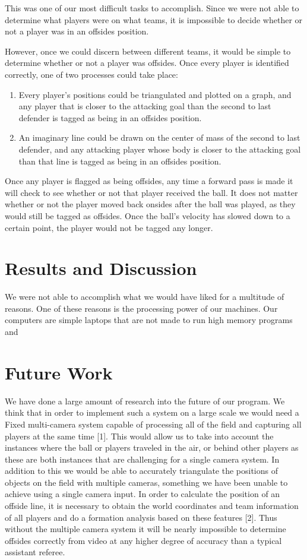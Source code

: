 \documentclass[letterpaper, 10 pt, conference]{ieeeconf}  %
\begin{document}
This was one of our most difficult tasks to accomplish. Since we were not able to determine what players were on what teams, it is impossible to decide whether or not a player was in an offsides position. 

However, once we could discern between different teams, it would be simple to determine whether or not a player was offsides. Once every player is identified correctly, one of two processes could take place:
\begin{enumerate}
\item Every player's positions could be triangulated and plotted on a graph, and any player that is closer to the attacking goal than the second to last defender is tagged as being in an offsides position. 
\item An imaginary line could be drawn on the center of mass of the second to last defender, and any attacking player whose body is closer to the attacking goal than that line is tagged as being in an offsides position.
\end{enumerate}
Once any player is flagged as being offsides, any time a forward pass is made it will check to see whether or not that player received the ball. It does not matter whether or not the player moved back onsides after the ball was played, as they would still be tagged as offsides. Once the ball's velocity has slowed down to a certain point, the player would not be tagged any longer. 


\section{Results and Discussion}

We were not able to accomplish what we would have liked for a multitude of reasons. One of these reasons is the processing power of our machines. Our computers are simple laptops that are not made to run high memory programs and 

\section{Future Work}

We have done a large amount of research into the future of our program. We think that in order to implement such a system on a large scale we would need a Fixed multi-camera system capable of processing all of the field and capturing all players at the same time [1]. This would allow us to take into account the instances where the ball or players traveled in the air, or behind other players as these are both instances that are challenging for a single camera system. In addition to this we would be able to accurately triangulate the positions of objects on the field with multiple cameras, something we have been unable to achieve using a single camera input. In order to calculate the position of an offside line, it is necessary to obtain the world coordinates and team information of all players and do a formation analysis based on these features [2]. Thus without the multiple camera system it will be nearly impossible to determine offsides correctly from video at any higher degree of accuracy than a typical assistant referee.
\end{document}
